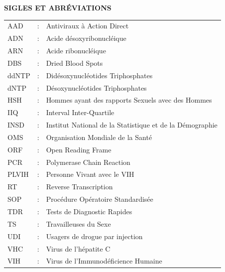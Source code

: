 \documentclass[a4paper,12pt]{article}
\begin{document}
\onehalfspacing
	
	\newpage
	\pagestyle{plain}
			
\cleardoublepage	
\tableofcontents
\thispagestyle{empty}
\cleardoublepage
{}
\setcounter{page}{1}

{}

\textbf{\huge SIGLES ET ABRÉVIATIONS}

\vspace{1.5cm}

\renewcommand{\arraystretch}{1.4}
\begin{tabular}{p{3cm} c p{10cm}}

AAD & : & Antiviraux à Action Direct \\ 
ADN & : & Acide désoxyribonucléique \\
ARN & : & Acide ribonucléique \\
DBS & : &  Dried Blood Spots \\
ddNTP & : & Didésoxynucléotides Triphosphates\\
dNTP & : & Désoxynucléotides Triphosphates\\
HSH & : & Hommes ayant des rapports Sexuels avec des Hommes\\
IIQ & : & Interval Inter-Quartile \\
INSD &: & Institut National de la Statistique et de la Démographie \\
OMS & : & Organisation Mondiale de la Santé \\
ORF & : & Open Reading Frame \\
PCR &: & Polymerase Chain Reaction \\
PLVIH & : & Personne Vivant avec le VIH \\
RT & : & Reverse Transcription \\
SOP & : &  Procédure Opératoire Standardisée \\
TDR & :  & Tests de Diagnostic Rapides \\
TS & : &   Travailleuses du Sexe \\
UDI & : & Usagers de drogue par injection \\
VHC & : & Virus de l’hépatite C \\
VIH & : & Virus de l'Immunodéficience Humaine \\
 \end{tabular}
\clearpage
{}
{}
\end{document}
